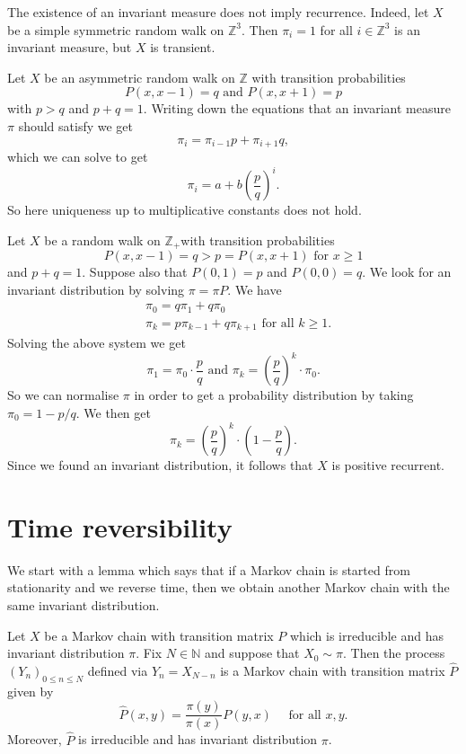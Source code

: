 \documentclass[a4paper,11pt]{article}
\begin{document}
\begin{remark}
    The existence of an invariant measure does not imply recurrence. Indeed, let $X$ be a simple symmetric random walk on $\mathbb{Z}^3$. Then $\pi_i=1$ for all $i \in \mathbb{Z}^3$ is an invariant measure, but $X$ is transient.
\end{remark}

\begin{example}
    Let $X$ be an asymmetric random walk on $\mathbb{Z}$ with transition probabilities
    \[
    P(x, x-1)=q \text { and } P(x, x+1)=p
    \]
    with $p>q$ and $p+q=1$. Writing down the equations that an invariant measure $\pi$ should satisfy we get
    \[
    \pi_i=\pi_{i-1} p+\pi_{i+1} q,
    \]
    which we can solve to get
    \[
    \pi_i=a+b\left(\frac{p}{q}\right)^i .
    \]
    So here uniqueness up to multiplicative constants does not hold.
\end{example}

\begin{example}
    Let $X$ be a random walk on $\mathbb{Z}_{+}$with transition probabilities
    \[
    P(x, x-1)=q>p=P(x, x+1) \text { for } x \geq 1
    \]
    and $p+q=1$. Suppose also that $P(0,1)=p$ and $P(0,0)=q$. We look for an invariant distribution by solving $\pi=\pi P$. We have
    \[
    \begin{aligned}
    &\pi_0=q \pi_1+q \pi_0 \\
    &\pi_k=p \pi_{k-1}+q \pi_{k+1} \text { for all } k \geq 1 .
    \end{aligned}
    \]
    Solving the above system we get
    \[
    \pi_1=\pi_0 \cdot \frac{p}{q} \text { and } \pi_k=\left(\frac{p}{q}\right)^k \cdot \pi_0 .
    \]
    So we can normalise $\pi$ in order to get a probability distribution by taking $\pi_0=1-p / q$. We then get
    \[
    \pi_k=\left(\frac{p}{q}\right)^k \cdot\left(1-\frac{p}{q}\right) .
    \]
    Since we found an invariant distribution, it follows that $X$ is positive recurrent.
\end{example}

\section{Time reversibility}

We start with a lemma which says that if a Markov chain is started from stationarity and we reverse time, then we obtain another Markov chain with the same invariant distribution.

\begin{proposition}
    Let $X$ be a Markov chain with transition matrix $P$ which is irreducible and has invariant distribution $\pi$. Fix $N \in \mathbb{N}$ and suppose that $X_0 \sim \pi$. Then the process $\left(Y_n\right)_{0 \leq n \leq N}$ defined via $Y_n=X_{N-n}$ is a Markov chain with transition matrix $\widehat{P}$ given by
    \[
    \widehat{P}(x, y)=\frac{\pi(y)}{\pi(x)} P(y, x) \quad \text { for all } x, y .
    \]
    Moreover, $\widehat{P}$ is irreducible and has invariant distribution $\pi$.
\end{proposition}
\end{document}
